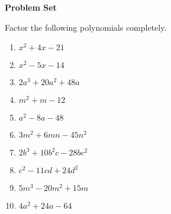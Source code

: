 \textbf{Problem Set}

\vspce

Factor the following polynomials completely.  
\begin{enumerate} 


\item \hspce $x^{2} + 4x - 21 $
\item \hspce $x^{2} - 5x - 14$
\item \hspce $2a^{3} + 20a^{2} + 48a	$
\item \hspce $m^{2} + m - 12$
\item \hspce $a^{2} - 8a - 48$

\item \hspce $3 m^{2} + 6 m n - 45 n^{2} $
\item \hspce $2 b^{3} + 10 b^{2} c - 28 b c^{2}$
\item \hspce $c^{2} - 11 c d + 24 d^{2}$
\item \hspce $5 m^{3} - 20 m^{2} + 15 m$
\item \hspce $4 a^{2} + 24 a - 64$

 
\end{enumerate}